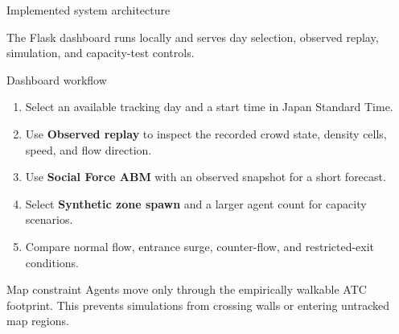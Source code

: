 \documentclass[aspectratio=169]{beamer}
\begin{document}
\begin{frame}{Implemented system architecture}
\centering
{}
\vspace{0.35cm}
\small The Flask dashboard runs locally and serves day selection, observed replay, simulation, and capacity-test controls.
\end{frame}

\begin{frame}{Dashboard workflow}
\begin{enumerate}
  \item Select an available tracking day and a start time in Japan Standard Time.
  \item Use \textbf{Observed replay} to inspect the recorded crowd state, density cells, speed, and flow direction.
  \item Use \textbf{Social Force ABM} with an observed snapshot for a short forecast.
  \item Select \textbf{Synthetic zone spawn} and a larger agent count for capacity scenarios.
  \item Compare normal flow, entrance surge, counter-flow, and restricted-exit conditions.
\end{enumerate}
\begin{block}{Map constraint}
Agents move only through the empirically walkable ATC footprint. This prevents simulations from crossing walls or entering untracked map regions.
\end{block}
\end{frame}
\end{document}
